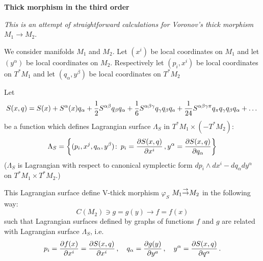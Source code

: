 
\baselineskip=17pt



\def\vare {\varepsilon}
\def\A {{\bf A}}
\def\t {\tilde}
\def\a {\alpha}
\def\K {{\bf K}}
\def\N {{\bf N}}
\def\V {{\cal V}}
\def\s {{\sigma}}
\def\S {{\bf S}}
\def\s {{\sigma}}
\def\bs {{\bf s}}
\def\p{\partial}
\def\vare{{\varepsilon}}
\def\Q {{\bf Q}}
\def\D {{\cal D}}
\def\L {{\cal L}}
\def\G {{\Gamma}}
\def\C {{\bf C}}
\def\M {{\cal M}}
\def\Z {{\bf Z}}
\def\U  {{\cal U}}
\def\H {{\cal H}}
\def\R  {{\bf R}}
\def\E  {{\bf E}}
\def\l {\lambda}
\def\degree {{\bf {\rm degree}\,\,}}
\def \finish {${\,\,\vrule height1mm depth2mm width 8pt}$}
\def \m {\medskip}
\def\p {\partial}
\def\r {{\bf r}}
\def\v {{\bf v}}
\def\n {{\bf n}}
\def\t {{\bf t}}
\def\b {{\bf b}}
\def\e{{\bf e}}
\def\f{{\bf f}}
\def\ac {{\bf a}}
\def \X   {{\bf X}}
\def \Y   {{\bf Y}}
\def\diag {\rm diag\,\,}
\def\pt {{\bf p}}
\def\w {\omega}
\def\la{\langle}
\def\ra{\rangle}
\def\x{{\bf x}}
\def\m {\medskip}
\def\thick {{\buildrel \to\over \to}}

  \centerline{\bf Thick morphism in the third order}

{\it This is an attempt of straightforward calculations for
Voronov's  thick morphism $M_1\to M_2$}.


We consider manifolds $M_1$ and $M_2$.
Let $(x^i)$ be local coordinates on $M_1$
and let $(y^\a)$ be local coordinates on $M_2$.
Respectively let $(p_i,x^i)$ be local coordinates on $T^*M_1$
and let $(q_\a,y^\beta)$ be local coordinates on $T^*M_2$





Let  
       $$
S(x,q)=S(x)+S^\a(x)q_\a+{1\over 2}S^{\a\beta}q_\beta q_\a
+{1\over 6}S^{\a\beta\gamma}q_\gamma q_\beta q_a
+{1\over 24}S^{\a\beta\gamma\pi}q_\pi q_\gamma q_\beta q_\a+\dots
       $$
be a function which defines Lagrangian surface 
$\Lambda_S$ in $T^*M_1\times (-T^*M_2)$:
            $$
\Lambda_S=\left\{(p_i,x^j,q_\a,y^\beta)\colon\, 
p_i={\p S(x,q)\over \p x^i}\,,y^\a={\p S(x,q)\over \p q_\a}\right\}
            $$
($\Lambda_S$ is Lagrangian with respect to canonical symplectic form 
$dp_i\wedge dx^i-dq_\a dy^\a$ on $T^*M_1\times T^*M_2$.)


  This Lagrangian surface define V-thick morphism $\varphi_S$ 
$M_1\thick M_2$
in the following way:
                $$
C(M_2) \ni g=g(y)\to f=f(x)
                $$
        such that Lagrangian surfaces defined by graphs
of functions $f$ and $g$ are related with Lagrangian 
surface $\Lambda_S$, i.e.
          $$
p_i={\p f(x)\over \p x^i}={\p S(x,q)\over \p x^i}\,,\quad
q_\a={\p g(y)\over \p y^a}\,,\quad y^\a={\p S(x,q)\over \p q^\a}\,.
 $$



